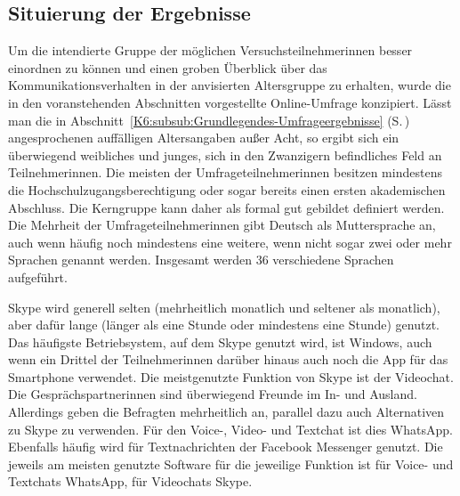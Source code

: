 

\subsection{Situierung der Ergebnisse}
\label{K6:subsec:situierung:allgemeine-Umfrage-SkypeTL}


Um die intendierte Gruppe der möglichen Versuchsteilnehmer{\textperiodcentered}innen besser einordnen zu können und einen groben Überblick über das Kommunikationsverhalten in der anvisierten Altersgruppe zu erhalten, wurde die in den voranstehenden Abschnitten vorgestellte Online-Umfrage konzipiert. Lässt man die in Abschnitt~\ref{K6:subsub:Grundlegendes-Umfrageergebnisse} (S.\,\pageref{K6:subsub:Grundlegendes-Umfrageergebnisse}) angesprochenen auffälligen Altersangaben außer Acht, so ergibt sich ein überwiegend weibliches und junges, sich in den Zwanzigern befindliches Feld an Teilnehmer{\textperiodcentered}innen. Die meisten der Umfrageteilnehmer{\textperiodcentered}innen besitzen mindestens die Hochschulzugangsberechtigung oder sogar bereits einen ersten akademischen Abschluss. Die Kerngruppe kann daher als formal gut gebildet definiert werden. Die Mehrheit der Umfrageteilnehmer{\textperiodcentered}innen gibt Deutsch als Muttersprache an, auch wenn häufig noch mindestens eine weitere, wenn nicht sogar zwei oder mehr Sprachen genannt werden. Insgesamt werden 36 verschiedene Sprachen aufgeführt.

Skype wird generell selten (mehrheitlich monatlich und seltener als monatlich), aber dafür lange (länger als eine Stunde oder mindestens eine Stunde) genutzt. Das häufigste Betriebsystem, auf dem Skype genutzt wird, ist Windows, auch wenn ein Drittel der Teilnehmer{\textperiodcentered}innen darüber hinaus auch noch die App für das Smartphone verwendet. Die meistgenutzte Funktion von Skype ist der Videochat. Die Gesprächspartner{\textperiodcentered}innen sind überwiegend Freunde im In- und Ausland. Allerdings geben die Befragten mehrheitlich an, parallel dazu auch Alternativen zu Skype zu verwenden. Für den Voice-, Video- und Textchat ist dies WhatsApp. Ebenfalls häufig wird für Textnachrichten der Facebook Messenger genutzt. Die jeweils am meisten genutzte Software für die jeweilige Funktion ist für Voice- und Textchats WhatsApp, für Videochats Skype.

